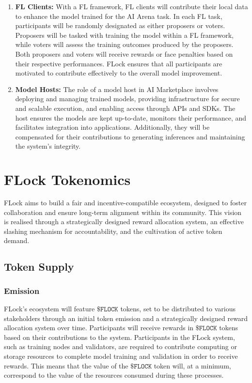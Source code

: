 \documentclass[conference]{IEEEtran}
\newcommand{\FML}{\ensuremath{\xspace\texttt{\$FLOCK}}\xspace}
\begin{document}
\begin{enumerate}
    \item \textbf{FL Clients:} With a FL framework, FL clients will contribute their local data to enhance the model trained for the AI Arena task. In each FL task, participants will be randomly designated as either proposers or voters. Proposers will be tasked with training the model within a FL framework, while voters will assess the training outcomes produced by the proposers. Both proposers and voters will receive rewards or face penalties based on their respective performances. FLock ensures that all participants are motivated to contribute effectively to the overall model improvement.


    \item \textbf{Model Hosts:} The role of a model host in AI Marketplace involves deploying and managing trained models, providing infrastructure for secure and scalable execution, and enabling access through APIs and SDKs. The host ensures the models are kept up-to-date, monitors their performance, and facilitates integration into applications. Additionally, they will be compensated for their contributions to generating inferences and maintaining the system's integrity.
\end{enumerate}



\section{FLock Tokenomics}
FLock aims to build a fair and incentive-compatible ecosystem, designed to foster collaboration and ensure long-term alignment within its community. This vision is realised through a strategically designed reward allocation system, an effective slashing mechanism for accountability, and the cultivation of active token demand. 


\subsection{Token Supply}

\subsubsection{Emission}
FLock's ecosystem will feature \FML tokens, set to be distributed to various stakeholders through an initial token emission and a strategically designed reward allocation system over time. Participants will receive rewards in \FML tokens based on their contributions to the system. Participants in the FLock system, such as training nodes and validators, are required to contribute computing or storage resources to complete model training and validation in order to receive rewards. This means that the value of the \FML token will, at a minimum, correspond to the value of the resources consumed during these processes.
\end{document}
